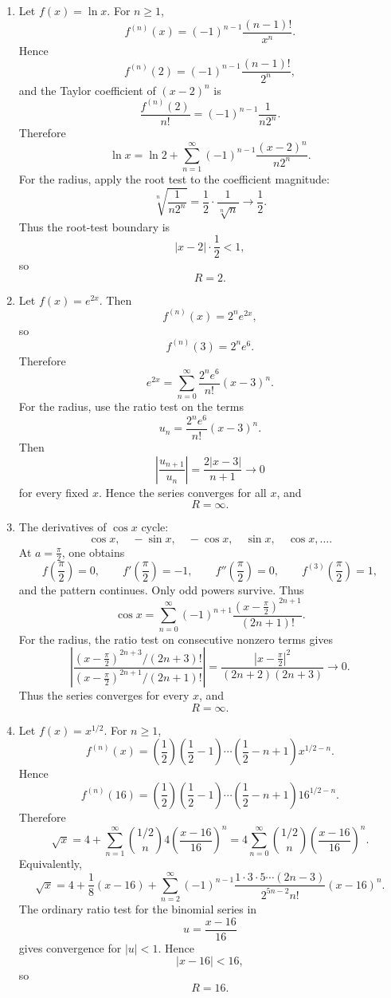 \documentclass[12pt]{article}
\begin{document}
\begin{enumerate}[label=(\alph*)]

\item
Let \(f(x)=\ln x\). For \(n\ge 1\),
\[
f^{(n)}(x)=(-1)^{n-1}\frac{(n-1)!}{x^n}.
\]
Hence
\[
f^{(n)}(2)=(-1)^{n-1}\frac{(n-1)!}{2^n},
\]
and the Taylor coefficient of \((x-2)^n\) is
\[
\frac{f^{(n)}(2)}{n!}=(-1)^{n-1}\frac{1}{n2^n}.
\]
Therefore
\[
\boxed{
\ln x=\ln 2+\sum_{n=1}^{\infty}(-1)^{n-1}\frac{(x-2)^n}{n2^n}.
}
\]
For the radius, apply the root test to the coefficient magnitude:
\[
\sqrt[n]{\frac{1}{n2^n}}=\frac{1}{2}\cdot \frac{1}{\sqrt[n]{n}}\to \frac12.
\]
Thus the root-test boundary is
\[
|x-2|\cdot \frac12<1,
\]
so
\[
\boxed{R=2.}
\]

\item
Let \(f(x)=e^{2x}\). Then
\[
f^{(n)}(x)=2^n e^{2x},
\]
so
\[
f^{(n)}(3)=2^n e^6.
\]
Therefore
\[
\boxed{
e^{2x}=\sum_{n=0}^{\infty}\frac{2^n e^6}{n!}(x-3)^n.
}
\]
For the radius, use the ratio test on the terms
\[
u_n=\frac{2^n e^6}{n!}(x-3)^n.
\]
Then
\[
\left|\frac{u_{n+1}}{u_n}\right|
=\frac{2|x-3|}{n+1}\to 0
\]
for every fixed \(x\). Hence the series converges for all \(x\), and
\[
\boxed{R=\infty.}
\]

\item
The derivatives of \(\cos x\) cycle:
\[
\cos x,\quad -\sin x,\quad -\cos x,\quad \sin x,\quad \cos x,\ldots.
\]
At \(a=\frac{\pi}{2}\), one obtains
\[
f\!\left(\frac{\pi}{2}\right)=0,\qquad
f'\!\left(\frac{\pi}{2}\right)=-1,\qquad
f''\!\left(\frac{\pi}{2}\right)=0,\qquad
f^{(3)}\!\left(\frac{\pi}{2}\right)=1,
\]
and the pattern continues. Only odd powers survive. Thus
\[
\boxed{
\cos x=\sum_{n=0}^{\infty}(-1)^{n+1}
\frac{\left(x-\frac{\pi}{2}\right)^{2n+1}}{(2n+1)!}.
}
\]
For the radius, the ratio test on consecutive nonzero terms gives
\[
\left|
\frac{
\left(x-\frac{\pi}{2}\right)^{2n+3}/(2n+3)!
}{
\left(x-\frac{\pi}{2}\right)^{2n+1}/(2n+1)!
}
\right|
=
\frac{\left|x-\frac{\pi}{2}\right|^2}{(2n+2)(2n+3)}
\to 0.
\]
Thus the series converges for every \(x\), and
\[
\boxed{R=\infty.}
\]

\item
Let \(f(x)=x^{1/2}\). For \(n\ge 1\),
\[
f^{(n)}(x)=\left(\frac12\right)\left(\frac12-1\right)\cdots
\left(\frac12-n+1\right)x^{1/2-n}.
\]
Hence
\[
f^{(n)}(16)=
\left(\frac12\right)\left(\frac12-1\right)\cdots
\left(\frac12-n+1\right)16^{1/2-n}.
\]
Therefore
\[
\boxed{
\sqrt{x}
=
4+\sum_{n=1}^{\infty}
\binom{1/2}{n}4\left(\frac{x-16}{16}\right)^n
=
4\sum_{n=0}^{\infty}\binom{1/2}{n}\left(\frac{x-16}{16}\right)^n.
}
\]
Equivalently,
\[
\sqrt{x}
=
4+\frac18(x-16)
+
\sum_{n=2}^{\infty}
(-1)^{n-1}
\frac{1\cdot 3\cdot 5\cdots (2n-3)}{2^{5n-2}n!}(x-16)^n.
\]
The ordinary ratio test for the binomial series in
\[
u=\frac{x-16}{16}
\]
gives convergence for \(|u|<1\). Hence
\[
|x-16|<16,
\]
so
\[
\boxed{R=16.}
\]


\end{enumerate}
\end{document}
